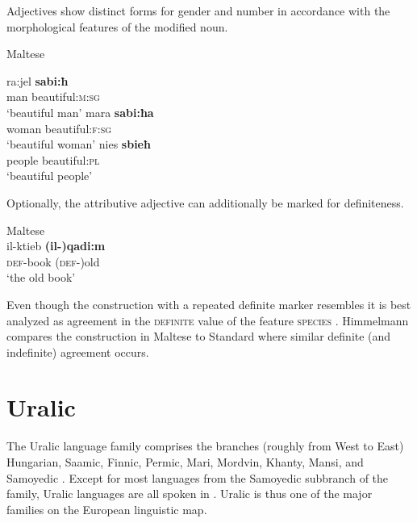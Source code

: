 Adjectives show distinct forms for gender and number in accordance with the morphological features of the modified noun.
\begin{exe}
\ex \rm{Maltese \citep[328]{aquilina1959}}
\begin{xlist}
\ex
\gll	ra:jel \textbf{sabi:ħ}\\
	man beautiful:\textsc{m:sg}\\
\glt	‘beautiful man’
\ex
\gll	mara \textbf{sabi:ħa}\\
	woman beautiful:\textsc{f:sg}\\
\glt	‘beautiful woman’
\ex
\gll	nies \textbf{sbieħ}\\
	people beautiful:\textsc{pl}\\
\glt	‘beautiful people’
\end{xlist}
\end{exe}
Optionally, the attributive adjective can additionally be marked for definiteness.
\begin{exe}
\ex \rm{Maltese \citep[330]{aquilina1959}}\\
\gll	il-ktieb \textbf{(il-)qadi:m}\\
	\textsc{def}-book	(\textsc{def-})old\\
\glt	‘the old book’
\end{exe}
Even though the construction with a repeated definite marker resembles  it is best analyzed as agreement in the \textsc{definite} value of the feature \textsc{species} \citep[179]{himmelmann1997}. Himmelmann compares the construction in Maltese to Standard  where similar definite (and indefinite) agreement occurs.
				
\section{Uralic}\label{uralic synchr}
The Uralic language family comprises the branches (roughly from West to East) Hungarian, Saamic, Finnic, Permic, Mari, Mordvin, Khanty, Mansi, and Samoyedic \citep[216–218]{salminen2007}. Except for most languages from the Samoyedic subbranch of the family, Uralic languages are all spoken in . Uralic is thus one of the major families on the European linguistic map.


